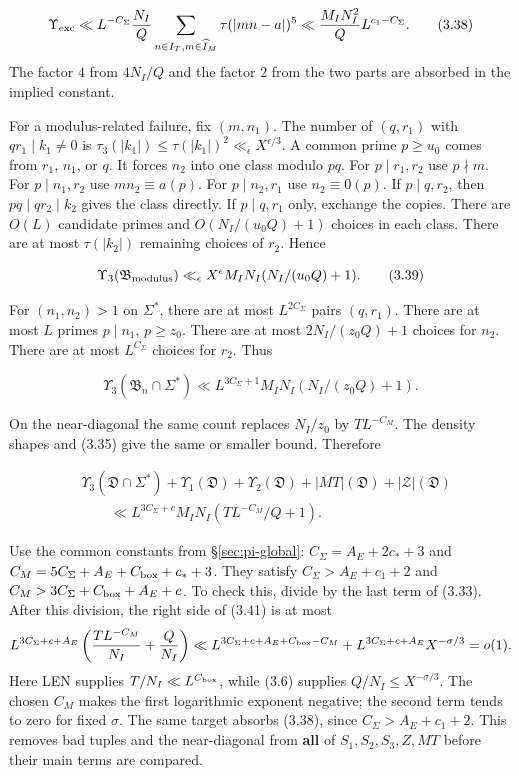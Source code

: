 \[
\Upsilon_{\rm exc}\ll L^{-C_\Sigma}\frac{N_I}{Q}
 \sum_{n\in I_T,m\in\widehat I_M}\tau(|mn-a|)^5
 \ll \frac{M_IN_I^2}{Q}L^{c_1-C_\Sigma}.
\tag{3.38}
\]
The factor $4$ from $4N_I/Q$ and the factor $2$ from the two parts are
absorbed in the implied constant.

For a modulus-related failure, fix $(m,n_1)$. The number of
$(q,r_1)$ with $qr_1\mid k_1\ne0$ is
$\tau_3(|k_1|)\le\tau(|k_1|)^2\ll_\epsilon X^{\epsilon/3}$.
A common prime $p\ge u_0$ comes from $r_1$, $n_1$, or $q$.
It forces $n_2$ into one class modulo $pq$.
For $p\mid r_1,r_2$ use $p\nmid m$.
For $p\mid n_1,r_2$ use $mn_2\equiv a(p)$.
For $p\mid n_2,r_1$ use $n_2\equiv0(p)$.
If $p\mid q,r_2$, then $pq\mid qr_2\mid k_2$ gives the class directly.
If $p\mid q,r_1$ only, exchange the copies.
There are $O(L)$ candidate primes and $O(N_I/(u_0Q)+1)$ choices in each class.
There are at most $\tau(|k_2|)$ remaining choices of $r_2$. Hence

\[
\Upsilon_3(\mathfrak B_{\rm modulus})
 \ll_\epsilon X^\epsilon M_IN_I(N_I/(u_0Q)+1).
\tag{3.39}
\]

For $(n_1,n_2)>1$ on $\Sigma^*$, there are at most $L^{2C_\Sigma}$
pairs $(q,r_1)$. There are at most $L$ primes $p\mid n_1$, $p\ge z_0$.
There are at most $2N_I/(z_0Q)+1$ choices for $n_2$.
There are at most $L^{C_\Sigma}$ choices for $r_2$. Thus

\[
\Upsilon_3(\mathfrak B_n\cap\Sigma^*)
 \ll L^{3C_\Sigma+1}M_IN_I(N_I/(z_0Q)+1).
\tag{3.40}
\]

On the near-diagonal the same count replaces $N_I/z_0$ by
$TL^{-C_M}$. The density shapes and (3.35) give the same or smaller
bound. Therefore

\[
\begin{aligned}
&\Upsilon_3(\mathfrak D\cap\Sigma^*)+\Upsilon_1(\mathfrak D)+\Upsilon_2(\mathfrak D)
 +|MT|(\mathfrak D)+|\mathcal Z|(\mathfrak D)\\
&\qquad\ll L^{3C_\Sigma+c}M_IN_I(TL^{-C_M}/Q+1).
\end{aligned}
\tag{3.41}
\]

Use the common constants from \S\ref{sec:pi-global}:
$C_\Sigma=A_E+2c_*+3$ and
$C_M=5C_\Sigma+A_E+C_{\rm box}+c_*+3$.
They satisfy $C_\Sigma>A_E+c_1+2$ and
$C_M>3C_\Sigma+C_{\rm box}+A_E+c$.
To check this, divide by the last term of (3.33). After this division, the right side
of (3.41) is at most
\[
L^{3C_\Sigma+c+A_E}
\left(\frac{T L^{-C_M}}{N_I}+\frac{Q}{N_I}\right)
\ll L^{3C_\Sigma+c+A_E+C_{\rm box}-C_M}
   +L^{3C_\Sigma+c+A_E}X^{-\sigma/3}=o(1).
\]
Here LEN supplies $T/N_I\ll L^{C_{\rm box}}$, while (3.6)
supplies $Q/N_I\le X^{-\sigma/3}$. The chosen $C_M$ makes
the first logarithmic exponent negative; the second term tends to zero
for fixed $\sigma$. The same target absorbs (3.38), since
$C_\Sigma>A_E+c_1+2$.
This removes bad tuples and the near-diagonal from \textbf{all} of
$S_1,S_2,S_3,Z,MT$ before their main terms are compared.

